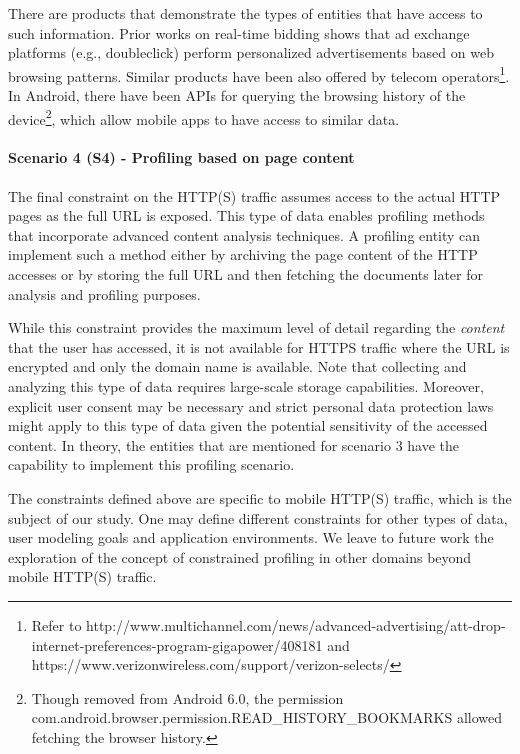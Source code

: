 There are products that demonstrate the types of entities that have access to such information. Prior works on real-time bidding \cite{carrascosa2015always} shows that ad exchange platforms (e.g., doubleclick) perform personalized advertisements based on web browsing patterns. Similar products have been also offered by telecom operators\footnote{Refer to http://www.multichannel.com/news/advanced-advertising/att-drop-internet-preferences-program-gigapower/408181 and https://www.verizonwireless.com/support/verizon-selects/}. 
 In Android, there have been APIs for querying the browsing history of the device\footnote{Though removed from Android 6.0, the permission com.android.browser.permission.READ\_HISTORY\_BOOKMARKS allowed fetching the browser history.}, which allow mobile apps to have access to similar data.

\paragraph{Scenario 4 (S4) - Profiling based on page content} 
The final constraint on the HTTP(S) traffic assumes access to the actual HTTP pages as the full URL is exposed. This type of data enables profiling methods that incorporate advanced content analysis techniques. A profiling entity can implement such a method either by archiving the page content of the HTTP accesses or by storing the full URL and then fetching the documents later for analysis and profiling purposes. 

While this constraint provides the maximum level of detail regarding the \textit{content} that the user has accessed, it is not available for HTTPS traffic where the URL is encrypted and only the domain name is available. Note that collecting and analyzing this type of data requires large-scale storage capabilities. Moreover, explicit user consent may be necessary and strict personal data protection laws might apply to this type of data given the potential sensitivity of the accessed content. In theory, the entities that are mentioned for scenario 3 have the capability to implement this profiling scenario. 

The constraints defined above are specific to mobile HTTP(S) traffic, which is the subject of our study. One may define different constraints for other types of data, user modeling goals and application environments. We leave to future work the exploration of the concept of constrained profiling in other domains beyond mobile HTTP(S) traffic.
